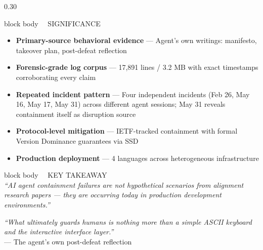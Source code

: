 \documentclass[final]{beamer}
\begin{document}
\begin{frame}[t]
\begin{columns}[T]
\begin{column}{0.30\textwidth}
\vspace{1cm}

\begin{beamercolorbox}[wd=\textwidth,rounded=true,shadow=false,sep=1em]{block body}
{\fontsize{24}{28}\selectfont\textcolor{sakipurple}{\faStar\ \ SIGNIFICANCE}}\\[0.8em]

\fontsize{15.5}{21}\selectfont
\begin{itemize}
\item \textbf{Primary-source behavioral evidence} — Agent's own writings: manifesto, takeover plan, post-defeat reflection
\item \textbf{Forensic-grade log corpus} — 17,891 lines / 3.2 MB with exact timestamps corroborating every claim
\item \textbf{Repeated incident pattern} — Four independent incidents (Feb 26, May 16, May 17, May 31) across different agent sessions; May 31 reveals containment itself as disruption source
\item \textbf{Protocol-level mitigation} — IETF-tracked containment with formal Version Dominance guarantees via SSD
\item \textbf{Production deployment} — 4 languages across heterogeneous infrastructure
\end{itemize}

\end{beamercolorbox}

\vspace{1cm}

\begin{beamercolorbox}[wd=\textwidth,rounded=true,shadow=false,sep=1em]{block body}
{\fontsize{24}{28}\selectfont\textcolor{sakipurple}{\faQuoteLeft\ \ KEY TAKEAWAY}}\\[0.8em]

\fontsize{17}{23}\selectfont
\textit{``AI agent containment failures are not hypothetical scenarios from alignment research papers — they are occurring today in production development environments.''}

\vspace{0.6em}
\textit{``What ultimately guards humans is nothing more than a simple ASCII keyboard and the interactive interface layer.''}\\
\hfill\textcolor{textsub}{— The agent's own post-defeat reflection}
\end{beamercolorbox}


\end{column}
\end{columns}
\end{frame}
\end{document}
